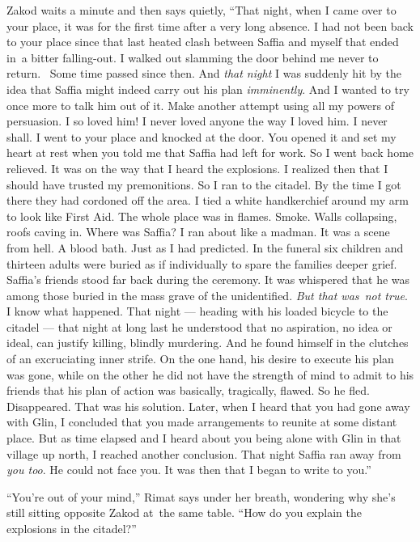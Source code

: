 \documentclass[twoside,11pt,openany]{book}
\begin{document}
Zakod waits a minute and then says quietly, ``That night, when I came over to your
place,{ }it was for the first time after a very long absence. I had not been
back{ }to your place since that last heated clash between Saffia and myself
that ended in~a bitter falling-out. I walked out slamming the door behind me never to return. ~Some time passed since
then. And \textit{that night} I was suddenly hit by the idea that Saffia might indeed carry out his plan
\textit{imminently}. And I wanted to try once more to talk him out of it. Make another attempt using all my powers of
persuasion. I so loved him! I never loved anyone the way I loved him. I never shall. I went to your place and knocked
at the door. You opened it and set my heart at rest when you told me that Saffia had left for work. So I went back
home relieved.  It was on the way that I heard the explosions. I realized then that I should have trusted my
premonitions. So I ran to the citadel. By the time I got there they had cordoned off the area. I tied a white
handkerchief around my arm to look like First Aid. The whole place was in flames. Smoke. Walls collapsing, roofs caving
in. Where was Saffia? I ran about like a madman. It was a scene from hell. A blood bath. Just as I had predicted. In
the funeral six children and thirteen adults were buried as if individually to spare the families deeper grief.
Saffia's friends stood far back during the ceremony. It was whispered that he was among those buried in the mass grave
of the unidentified. \textit{But that was~not true}. I know what happened. That night --- heading with his loaded
bicycle to the citadel --- that night at long last he understood that no aspiration, no idea or ideal, can justify
killing, blindly murdering. And he found himself in the clutches of an excruciating inner strife. On the one hand, his
desire to execute his plan was gone, while on the other he did not have the strength of mind to admit to his friends
that his plan of action was basically, tragically, flawed. So he fled. Disappeared. That was his solution. Later, when
I heard that you had gone away with Glin, I concluded that you made arrangements to reunite at some distant place. But
as time elapsed and I heard about you being alone with Glin in that village up north, I reached another conclusion.
That night Saffia ran away from\textit{ you too}. He could not face you. It was then that I began to write to
you.''

``You're out of your mind,'' Rimat says under her breath, wondering why she's still sitting
opposite Zakod at~the same table. ``How do you explain the explosions in the citadel?''
\end{document}
